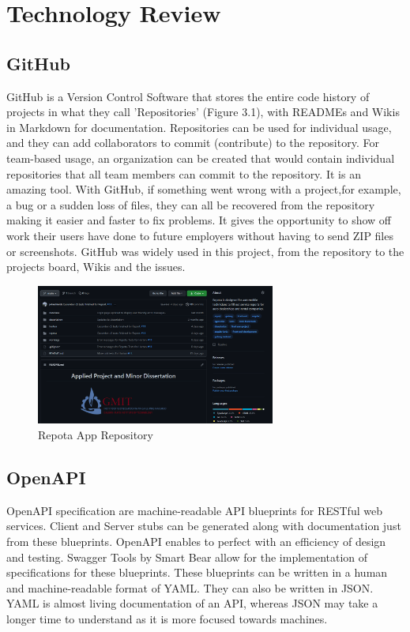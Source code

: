 \chapter{Technology Review}

\section{GitHub}
GitHub is a Version Control Software that stores the entire code history of projects in what they call 'Repositories' (Figure 3.1), with READMEs and Wikis in Markdown for documentation. Repositories can be used for individual usage, and they can add collaborators to commit (contribute) to the repository. For team-based usage, an organization can be created that would contain individual repositories that all team members can commit to the repository. It is an amazing tool. With GitHub, if something went wrong with a project,for example, a bug or a sudden loss of files, they can all be recovered from the repository making it easier and faster to fix problems. It gives the opportunity to show off work their users have done to future employers without having to send ZIP files or screenshots. GitHub was widely used in this project, from the repository to the projects board, Wikis and the issues.

\begin{figure}[H]
    \caption{Repota App Repository}
    \label{image:gitRepo}
    \centering
    \includegraphics[width=0.7\textwidth]{images/misc/git-repo.png}
\end{figure}

\section{OpenAPI}
OpenAPI specification are machine-readable API blueprints for RESTful web services. Client and Server stubs can be generated along with documentation just from these blueprints. OpenAPI enables to perfect with an efficiency of design and testing. Swagger Tools by Smart Bear allow for the implementation of specifications for these blueprints. These blueprints can be written in a human and machine-readable format of YAML. They can also be written in JSON.  YAML is almost living documentation of an API, whereas JSON may take a longer time to understand as it is more focused towards machines. \cite{ref6}

